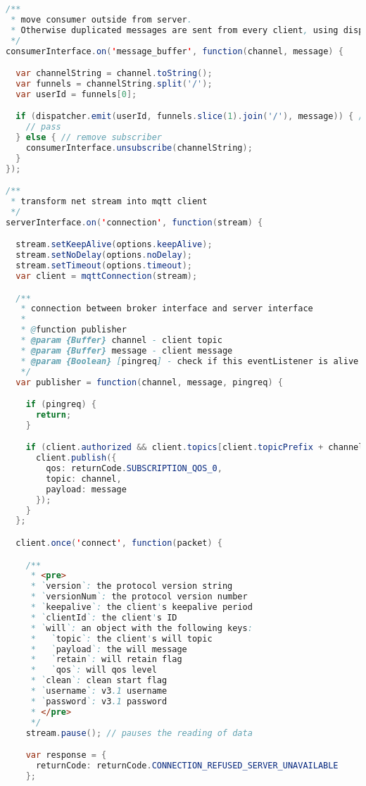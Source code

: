 \begin{lstlisting}[language=java, captionpos=b, caption={Dispatcher broker MQTT}, basicstyle=\scriptsize\ttfamily]
/**
 * move consumer outside from server.
 * Otherwise duplicated messages are sent from every client, using dispatcher
 */
consumerInterface.on('message_buffer', function(channel, message) {

  var channelString = channel.toString();
  var funnels = channelString.split('/');
  var userId = funnels[0];

  if (dispatcher.emit(userId, funnels.slice(1).join('/'), message)) { // had user
    // pass
  } else { // remove subscriber
    consumerInterface.unsubscribe(channelString);
  }
});

/**
 * transform net stream into mqtt client
 */
serverInterface.on('connection', function(stream) {

  stream.setKeepAlive(options.keepAlive);
  stream.setNoDelay(options.noDelay);
  stream.setTimeout(options.timeout);
  var client = mqttConnection(stream);

  /**
   * connection between broker interface and server interface
   *
   * @function publisher
   * @param {Buffer} channel - client topic
   * @param {Buffer} message - client message
   * @param {Boolean} [pingreq] - check if this eventListener is alive
   */
  var publisher = function(channel, message, pingreq) {

    if (pingreq) {
      return;
    }

    if (client.authorized && client.topics[client.topicPrefix + channel]) {
      client.publish({
        qos: returnCode.SUBSCRIPTION_QOS_0,
        topic: channel,
        payload: message
      });
    }
  };

  client.once('connect', function(packet) {

    /**
     * <pre>
     * `version`: the protocol version string
     * `versionNum`: the protocol version number
     * `keepalive`: the client's keepalive period
     * `clientId`: the client's ID
     * `will`: an object with the following keys:
     *   `topic`: the client's will topic
     *   `payload`: the will message
     *   `retain`: will retain flag
     *   `qos`: will qos level
     * `clean`: clean start flag
     * `username`: v3.1 username
     * `password`: v3.1 password
     * </pre>
     */
    stream.pause(); // pauses the reading of data

    var response = {
      returnCode: returnCode.CONNECTION_REFUSED_SERVER_UNAVAILABLE
    };


\end{lstlisting}
